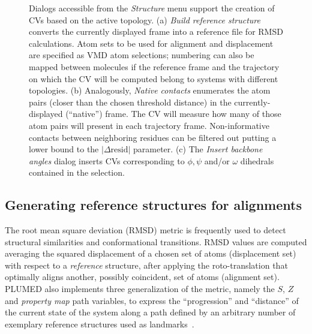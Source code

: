 \documentclass[preprint,review,11pt]{elsarticle}
\begin{document}
\begin{figure}
  \centering
  \caption{Dialogs accessible from the \emph{Structure} menu support
    the creation of CVs based on the active topology. (a) \emph{Build
      reference structure} converts the currently displayed frame into
    a reference file for RMSD calculations.  Atom sets to be used for
    alignment and displacement are specified as VMD atom selections;
    numbering can also be mapped between molecules if the reference
    frame and the trajectory on which the CV will be computed belong
    to systems with different topologies. (b) Analogously,
    \emph{Native contacts} enumerates  the atom pairs (closer
    than the chosen threshold distance) in the currently-displayed
    (``native'') frame. The CV will measure how many of
    those atom pairs will present in each trajectory frame. 
    Non-informative contacts between neighboring residues can be
    filtered out putting a lower bound to the $| \Delta \mbox{resid}
    |$ parameter. (c) The \emph{Insert backbone angles} dialog inserts
    CVs corresponding to $\phi, \psi$ and/or $\omega$ 
    dihedrals contained in the selection.}\label{fig:structure}
\end{figure}

\subsection{Generating reference structures for alignments}


The root mean square deviation (RMSD) metric is frequently used to
detect structural similarities and conformational transitions.  RMSD
values are computed averaging the squared displacement of a chosen set
of atoms (displacement set) with respect to a \emph{reference}
structure, after applying the roto-translation that optimally aligns
another, possibly coincident, set of atoms (alignment set).  PLUMED
also implements three generalization of the metric, namely the $S$,
$Z$ and \emph{property map} path variables, to express the
``progression'' and ``distance'' of the current state of the system
along a path defined by an arbitrary number of exemplary reference
structures used as
landmarks~\cite{Branduardi_Gervasio_Parrinello_2007,Spiwok_2011}.
\end{document}
